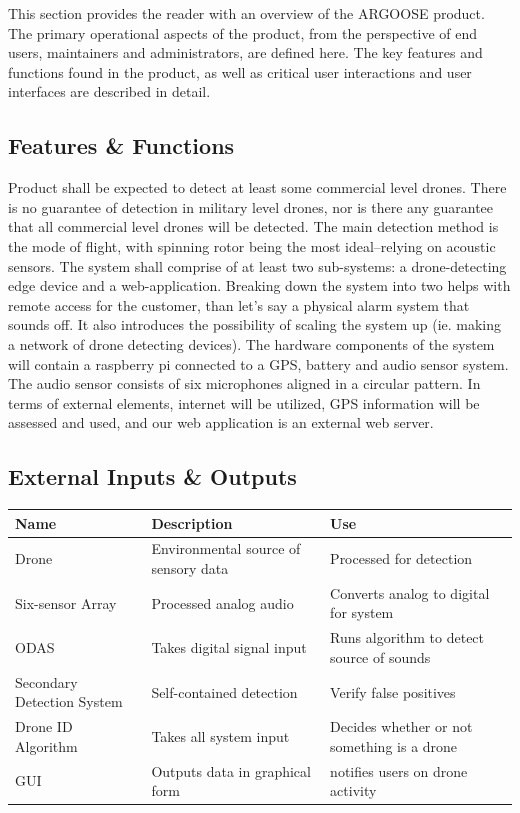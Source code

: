 This section provides the reader with an overview of the ARGOOSE product. The primary operational aspects of the product, from the perspective of end users, maintainers and administrators, are defined here. The key features and functions found in the product, as well as critical user interactions and user interfaces are described in detail.

\subsection{Features \& Functions}
Product shall be expected to detect at least some commercial level drones.  There is no guarantee of detection in military level drones, nor is there any guarantee that all commercial level drones will be detected.  The main detection method is the mode of flight, with spinning rotor being the most ideal--relying on acoustic sensors. The system shall comprise of at least two sub-systems: a drone-detecting edge device and a web-application.  Breaking down the system into two helps with remote access for the customer, than let's say a physical alarm system that sounds off. It also introduces the possibility of scaling the system up (ie. making a network of drone detecting devices).  The hardware components of the system will contain a raspberry pi connected to a GPS, battery and audio sensor system. The audio sensor consists of six microphones aligned in a circular pattern.  In terms of external elements, internet will be utilized, GPS information will be assessed and used, and our web application is an external web server.

\subsection{External Inputs \& Outputs}
\begin{table}[h]
\centering
\begin{tabularx}{\linewidth}{|l|l|>{\raggedright\arraybackslash}X|}
    \hline
\textbf{Name} & \textbf{Description} & \textbf{Use} \\ \hline
Drone & Environmental source of sensory data & Processed for detection \\ \hline
Six-sensor Array & Processed analog audio & Converts analog to digital for system \\ \hline
ODAS & Takes digital signal input & Runs algorithm to detect source of sounds \\ \hline
Secondary Detection System & Self-contained detection & Verify false positives \\ \hline
Drone ID Algorithm & Takes all system input & Decides whether or not something is a drone \\ \hline
GUI & Outputs data in graphical form & notifies users on drone activity \\ \hline
\end{tabularx}
    \end{table}

